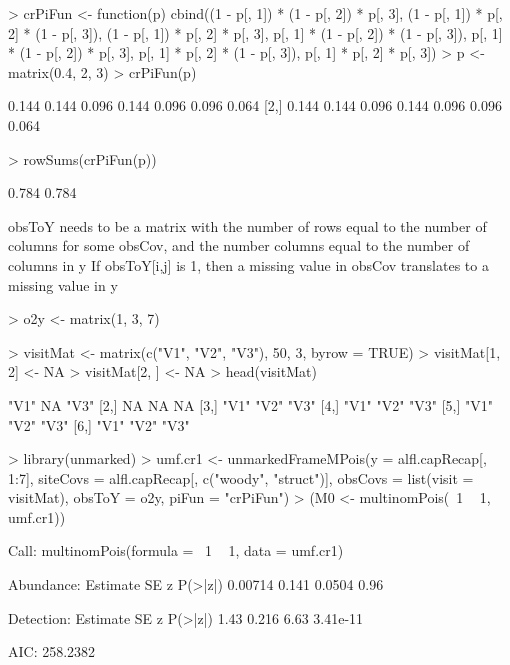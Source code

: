 \documentclass[a4paper]{article}
\renewenvironment{Schunk}{\vspace{\topsep}}{\vspace{\topsep}}
\begin{document}
\begin{Schunk}
\begin{Sinput}
> crPiFun <- function(p) {
     cbind((1 - p[, 1]) * (1 - p[, 2]) * p[, 3], (1 - 
         p[, 1]) * p[, 2] * (1 - p[, 3]), (1 - p[, 1]) * 
         p[, 2] * p[, 3], p[, 1] * (1 - p[, 2]) * (1 - 
         p[, 3]), p[, 1] * (1 - p[, 2]) * p[, 3], p[, 
         1] * p[, 2] * (1 - p[, 3]), p[, 1] * p[, 2] * 
         p[, 3])
 }
> p <- matrix(0.4, 2, 3)
> crPiFun(p)
\end{Sinput}
\begin{Soutput}
      [,1]  [,2]  [,3]  [,4]  [,5]  [,6]  [,7]
[1,] 0.144 0.144 0.096 0.144 0.096 0.096 0.064
[2,] 0.144 0.144 0.096 0.144 0.096 0.096 0.064
\end{Soutput}
\begin{Sinput}
> rowSums(crPiFun(p))
\end{Sinput}
\begin{Soutput}
[1] 0.784 0.784
\end{Soutput}
\end{Schunk}


obsToY needs to be a matrix with
the number of rows equal to the number of columns for some obsCov, and
the number columns equal to the number of columns in y
If obsToY[i,j] is 1, then a missing value in obsCov translates to
a missing value in y

\begin{Schunk}
\begin{Sinput}
> o2y <- matrix(1, 3, 7)
\end{Sinput}
\end{Schunk}



\begin{Schunk}
\begin{Sinput}
> visitMat <- matrix(c("V1", "V2", "V3"), 50, 3, byrow = TRUE)
> visitMat[1, 2] <- NA
> visitMat[2, ] <- NA
> head(visitMat)
\end{Sinput}
\begin{Soutput}
     [,1] [,2] [,3]
[1,] "V1" NA   "V3"
[2,] NA   NA   NA  
[3,] "V1" "V2" "V3"
[4,] "V1" "V2" "V3"
[5,] "V1" "V2" "V3"
[6,] "V1" "V2" "V3"
\end{Soutput}
\begin{Sinput}
> library(unmarked)
> umf.cr1 <- unmarkedFrameMPois(y = alfl.capRecap[, 1:7], 
     siteCovs = alfl.capRecap[, c("woody", "struct")], 
     obsCovs = list(visit = visitMat), obsToY = o2y, piFun = "crPiFun")
> (M0 <- multinomPois(~1 ~ 1, umf.cr1))
\end{Sinput}
\begin{Soutput}
Call:
multinomPois(formula = ~1 ~ 1, data = umf.cr1)

Abundance:
 Estimate    SE      z P(>|z|)
  0.00714 0.141 0.0504    0.96

Detection:
 Estimate    SE    z  P(>|z|)
     1.43 0.216 6.63 3.41e-11

AIC: 258.2382 
\end{Soutput}
\end{Schunk}
\end{document}
